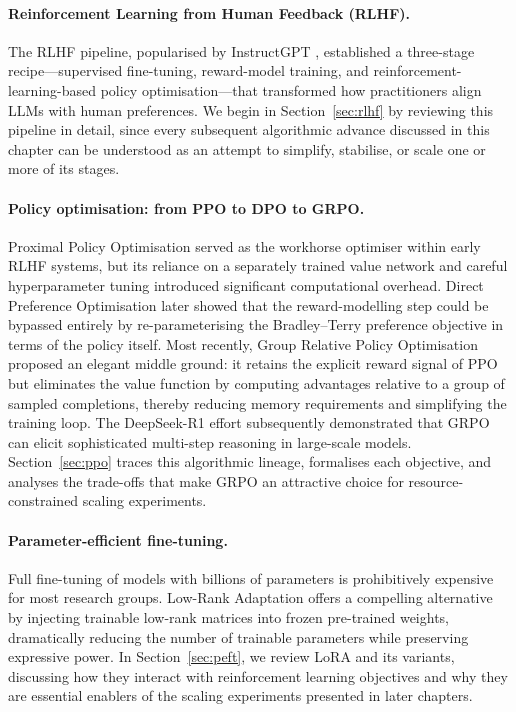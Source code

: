 \documentclass[12pt,a4paper]{report}
\begin{document}
\paragraph{Reinforcement Learning from Human Feedback (RLHF).}
The RLHF pipeline, popularised by InstructGPT \citep{ouyang2022instructgpt},
established a three-stage recipe---supervised fine-tuning, reward-model
training, and reinforcement-learning-based policy optimisation---that
transformed how practitioners align LLMs with human preferences.  We begin
in Section~\ref{sec:rlhf} by reviewing this pipeline in detail,
since every subsequent algorithmic advance discussed in this chapter can be
understood as an attempt to simplify, stabilise, or scale one or more of
its stages.

\paragraph{Policy optimisation: from PPO to DPO to GRPO.}
Proximal Policy Optimisation \citep[PPO;][]{schulman2017ppo} served as the
workhorse optimiser within early RLHF systems, but its reliance on a
separately trained value network and careful hyperparameter tuning introduced
significant computational overhead.  Direct Preference Optimisation
\citep[DPO;][]{rafailov2023dpo} later showed that the reward-modelling
step could be bypassed entirely by re-parameterising the Bradley--Terry
preference objective in terms of the policy itself.  Most recently, Group
Relative Policy Optimisation \citep[GRPO;][]{shao2024deepseekmath} proposed
an elegant middle ground: it retains the explicit reward signal of PPO but
eliminates the value function by computing advantages relative to a group
of sampled completions, thereby reducing memory requirements and simplifying
the training loop.  The DeepSeek-R1 effort \citep{deepseek2025r1}
subsequently demonstrated that GRPO can elicit sophisticated multi-step
reasoning in large-scale models.  Section~\ref{sec:ppo}
traces this algorithmic lineage, formalises each objective, and analyses the
trade-offs that make GRPO an attractive choice for resource-constrained
scaling experiments.

\paragraph{Parameter-efficient fine-tuning.}
Full fine-tuning of models with billions of parameters is prohibitively
expensive for most research groups.  Low-Rank Adaptation
\citep[LoRA;][]{hu2021lora} offers a compelling alternative by injecting
trainable low-rank matrices into frozen pre-trained weights, dramatically
reducing the number of trainable parameters while preserving expressive
power.  In Section~\ref{sec:peft}, we review LoRA and its variants,
discussing how they interact with reinforcement learning objectives and
why they are essential enablers of the scaling experiments presented in
later chapters.
\end{document}
